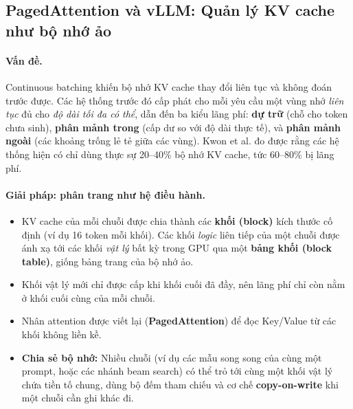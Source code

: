 \subsection{PagedAttention và vLLM: Quản lý KV cache như bộ nhớ ảo}
\label{ssec:pagedattention}

\paragraph{Vấn đề.} Continuous batching khiến bộ nhớ KV cache thay đổi liên tục và không đoán trước được. Các hệ thống trước đó cấp phát cho mỗi yêu cầu một vùng nhớ \emph{liên tục} đủ cho \emph{độ dài tối đa có thể}, dẫn đến ba kiểu lãng phí: \textbf{dự trữ} (chỗ cho token chưa sinh), \textbf{phân mảnh trong} (cấp dư so với độ dài thực tế), và \textbf{phân mảnh ngoài} (các khoảng trống lẻ tẻ giữa các vùng). Kwon et al. \cite{kwon2023vllm} đo được rằng các hệ thống hiện có chỉ dùng thực sự 20--40\% bộ nhớ KV cache, tức 60--80\% bị lãng phí.

\paragraph{Giải pháp: phân trang như hệ điều hành.}
\begin{itemize}
	\item KV cache của mỗi chuỗi được chia thành các \textbf{khối (block)} kích thước cố định (ví dụ 16 token mỗi khối). Các khối \emph{logic} liên tiếp của một chuỗi được ánh xạ tới các khối \emph{vật lý} bất kỳ trong GPU qua một \textbf{bảng khối (block table)}, giống bảng trang của bộ nhớ ảo.
	\item Khối vật lý mới chỉ được cấp khi khối cuối đã đầy, nên lãng phí chỉ còn nằm ở khối cuối cùng của mỗi chuỗi.
	\item Nhân attention được viết lại (\textbf{PagedAttention}) để đọc Key/Value từ các khối không liền kề.
	\item \textbf{Chia sẻ bộ nhớ:} Nhiều chuỗi (ví dụ các mẫu song song của cùng một prompt, hoặc các nhánh beam search) có thể trỏ tới cùng một khối vật lý chứa tiền tố chung, dùng bộ đếm tham chiếu và cơ chế \textbf{copy-on-write} khi một chuỗi cần ghi khác đi.
\end{itemize}

\begin{center}
\label{fig:pagedattention}
\end{center}

